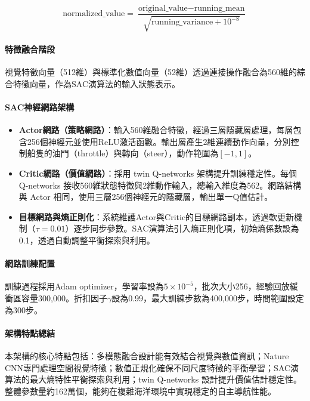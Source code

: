 \documentclass[12pt,a4paper]{article}
\begin{document}
\begin{equation}
\text{normalized\_value} = \frac{\text{original\_value} - \text{running\_mean}}{\sqrt{\text{running\_variance} + 10^{-8}}}
\end{equation}

\paragraph{特徵融合階段}

視覺特徵向量（512維）與標準化數值向量（52維）透過連接操作融合為560維的綜合特徵向量，作為SAC演算法的輸入狀態表示。

\paragraph{SAC神經網路架構}
\begin{itemize}

	\item \textbf{Actor網路（策略網路）}：輸入560維融合特徵，經過三層隱藏層處理，每層包含256個神經元並使用ReLU激活函數。輸出層產生2維連續動作向量，分別控制船隻的油門（throttle）與轉向（steer），動作範圍為$[-1, 1]$。
	
	\item \textbf{Critic網路（價值網路）}：採用 twin Q-networks 架構\cite{Atari}提升訓練穩定性。每個 Q-networks 接收560維狀態特徵與2維動作輸入，總輸入維度為562。網路結構與 Actor 相同，使用三層256個神經元的隱藏層，輸出單一Q值估計。
	
	\item \textbf{目標網路與熵正則化}：系統維護Actor與Critic的目標網路副本，透過軟更新機制（$\tau=0.01$）逐步同步參數。SAC演算法引入熵正則化項，初始熵係數設為0.1，透過自動調整平衡探索與利用。
\end{itemize}

\paragraph{網路訓練配置}

訓練過程採用Adam optimizer，學習率設為$5\times10^{-5}$，批次大小256，經驗回放緩衝區容量300,000。折扣因子$\gamma$設為0.99，最大訓練步數為400,000步，時間範圍設定為300步。

\paragraph{架構特點總結}

本架構的核心特點包括：多模態融合設計能有效結合視覺與數值資訊；Nature CNN專門處理空間視覺特徵；數值正規化確保不同尺度特徵的平衡學習；SAC演算法的最大熵特性平衡探索與利用；twin Q-networks 設計提升價值估計穩定性。整體參數量約162萬個，能夠在複雜海洋環境中實現穩定的自主導航性能。
\end{document}
